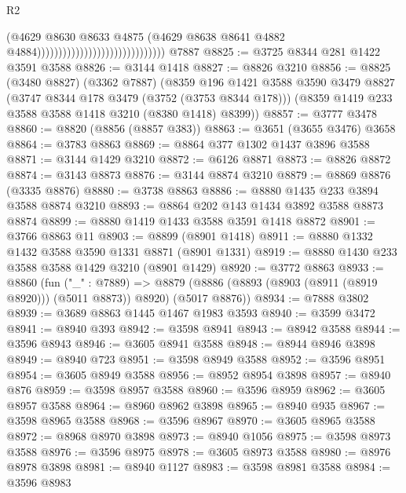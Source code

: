 \begin{lexlean}{R2}
\begin{coremodule}
                                                            (@4629
                                                              @8630
                                                              @8633
                                                              @4875
                                                              (@4629
                                                                @8638
                                                                @8641
                                                                @4882
                                                                @4884))))))))))))))))))))))))))))))
    @7887
@8825 := @3725 @8344 @281 @1422 @3591 @3588
@8826 := @3144 @1418
@8827 := @8826 @3210
@8856 := @8825
    (@3480 @8827)
    (@3362 @7887)
    (@8359
      @196
      @1421
      @3588
      @3590
      @3479
      @8827
      (@3747 @8344 @178 @3479 (@3752 (@3753 @8344 @178)))
      (@8359 @1419 @233 @3588 @3588 @1418 @3210 (@8380 @1418) @8399))
@8857 := @3777 @3478
@8860 := @8820 (@8856 (@8857 @383))
@8863 := @3651 (@3655 @3476) @3658
@8864 := @3783 @8863
@8869 := @8864 @377 @1302 @1437 @3896 @3588
@8871 := @3144 @1429 @3210
@8872 := @6126 @8871
@8873 := @8826 @8872
@8874 := @3143 @8873
@8876 := @3144 @8874 @3210
@8879 := @8869 @8876 (@3335 @8876)
@8880 := @3738 @8863
@8886 := @8880 @1435 @233 @3894 @3588 @8874 @3210
@8893 := @8864 @202 @143 @1434 @3892 @3588 @8873 @8874
@8899 := @8880 @1419 @1433 @3588 @3591 @1418 @8872
@8901 := @3766 @8863 @11
@8903 := @8899 (@8901 @1418)
@8911 := @8880 @1332 @1432 @3588 @3590 @1331 @8871 (@8901 @1331)
@8919 := @8880 @1430 @233 @3588 @3588 @1429 @3210 (@8901 @1429)
@8920 := @3772 @8863
@8933 := @8860
    (fun ("_" : @7889) =>
    @8879 (@8886 (@8893 (@8903 (@8911 (@8919 @8920))) (@5011 @8873)) @8920) (@5017 @8876))
@8934 := @7888 @3802
@8939 := @3689 @8863 @1445 @1467 @1983 @3593
@8940 := @3599 @3472
@8941 := @8940 @393
@8942 := @3598 @8941
@8943 := @8942 @3588
@8944 := @3596 @8943
@8946 := @3605 @8941 @3588
@8948 := @8944 @8946 @3898
@8949 := @8940 @723
@8951 := @3598 @8949 @3588
@8952 := @3596 @8951
@8954 := @3605 @8949 @3588
@8956 := @8952 @8954 @3898
@8957 := @8940 @876
@8959 := @3598 @8957 @3588
@8960 := @3596 @8959
@8962 := @3605 @8957 @3588
@8964 := @8960 @8962 @3898
@8965 := @8940 @935
@8967 := @3598 @8965 @3588
@8968 := @3596 @8967
@8970 := @3605 @8965 @3588
@8972 := @8968 @8970 @3898
@8973 := @8940 @1056
@8975 := @3598 @8973 @3588
@8976 := @3596 @8975
@8978 := @3605 @8973 @3588
@8980 := @8976 @8978 @3898
@8981 := @8940 @1127
@8983 := @3598 @8981 @3588
@8984 := @3596 @8983

\end{coremodule}
\end{lexlean}

